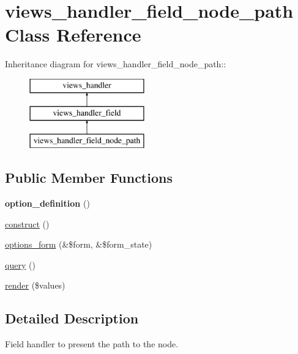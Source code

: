 \hypertarget{classviews__handler__field__node__path}{
\section{views\_\-handler\_\-field\_\-node\_\-path Class Reference}
\label{classviews__handler__field__node__path}
}
Inheritance diagram for views\_\-handler\_\-field\_\-node\_\-path::\begin{figure}[H]
\begin{center}
\leavevmode
\includegraphics[height=3cm]{classviews__handler__field__node__path}
\end{center}
\end{figure}
\subsection*{Public Member Functions}
\begin{DoxyCompactItemize}
\item 
\hypertarget{classviews__handler__field__node__path_a90ca65d2d782d1f58ceee0c9d53f4d23}{
{\bfseries option\_\-definition} ()}
\label{classviews__handler__field__node__path_a90ca65d2d782d1f58ceee0c9d53f4d23}

\item 
\hyperlink{classviews__handler__field__node__path_a9f8110039f0e7f6bb87792c222c7fd06}{construct} ()
\item 
\hyperlink{classviews__handler__field__node__path_af0eb803f6004582da8a3b4aa9e81cedf}{options\_\-form} (\&\$form, \&\$form\_\-state)
\item 
\hyperlink{classviews__handler__field__node__path_a59474fa6e78296b5f0c2aca6a951907e}{query} ()
\item 
\hyperlink{classviews__handler__field__node__path_a94067b369f0f373515cae33ad940ae2f}{render} (\$values)
\end{DoxyCompactItemize}


\subsection{Detailed Description}
Field handler to present the path to the node. 

